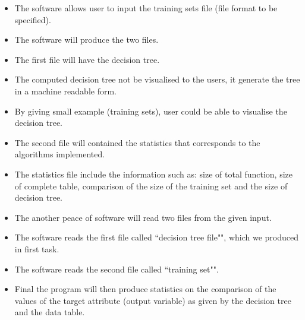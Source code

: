 \documentclass{report}
\begin{document}
    
\begin{itemize}

\item The software allows user to input the training sets file (file format to be specified).
    
\item The software will produce the two files.
  
\item The first file will have the decision tree.

\item The computed decision tree not be visualised to the users, it generate the tree in a machine readable form. 
	
\item By giving small example (training sets), user could be able to visualise the decision tree. 
	
\item The second file will contained the statistics that corresponds to the algorithms implemented.
	
\item The statistics file include the information such as: size of total function, size of complete table, comparison of the size of the training set and the size of decision tree.
	
\item The another peace of software will read two files from the given input.

\item The software reads the first file called ``decision tree file"", which we produced in first task.

\item The software reads the second file called ``training set"".
	
\item Final the program will then produce statistics on the comparison of the values of the target attribute (output variable) as given by the decision tree and the data table.
 
\end{itemize}






\end{document}
